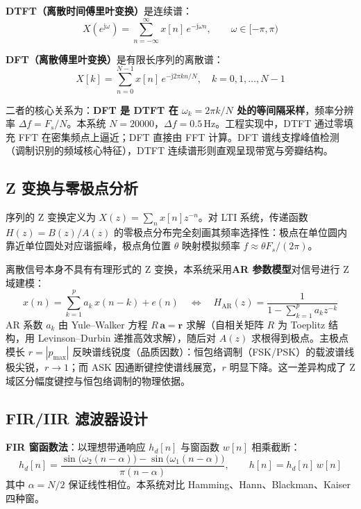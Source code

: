 \documentclass[12pt, a4paper, UTF8]{ctexart}
\begin{document}
\textbf{DTFT（离散时间傅里叶变换）}是连续谱：
\begin{equation}
X(e^{\mathrm{j}\omega}) = \sum_{n=-\infty}^{\infty} x[n]\,e^{-\mathrm{j}\omega n}, \qquad \omega \in [-\pi, \pi)
\end{equation}

\textbf{DFT（离散傅里叶变换）}是有限长序列的离散谱：
\begin{equation}
X[k] = \sum_{n=0}^{N-1} x[n]\,e^{-\mathrm{j}2\pi kn/N}, \quad k=0,1,\dots,N-1
\end{equation}

二者的核心关系为：\textbf{DFT 是 DTFT 在 $\omega_k = 2\pi k/N$ 处的等间隔采样}，频率分辨率 $\Delta f = F_s/N$。本系统 $N=20000$，$\Delta f = 0.5\,\mathrm{Hz}$。工程实现中，DTFT 通过零填充 FFT 在密集频点上逼近；DFT 直接由 FFT 计算。DFT 谱线支撑峰值检测（调制识别的频域核心特征），DTFT 连续谱形则直观呈现带宽与旁瓣结构。

\subsection{Z 变换与零极点分析}

序列的 Z 变换定义为 $X(z)=\sum_n x[n]z^{-n}$。对 LTI 系统，传递函数 $H(z)=B(z)/A(z)$ 的零极点分布完全刻画其频率选择性：极点在单位圆内靠近单位圆处对应谐振峰，极点角位置 $\theta$ 映射模拟频率 $f \approx \theta F_s/(2\pi)$。

离散信号本身不具有有理形式的 Z 变换，本系统采用\textbf{AR 参数模型}对信号进行 Z 域建模：
\begin{equation}
x(n) = \sum_{k=1}^{p} a_k\, x(n-k) + e(n) \quad\Longleftrightarrow\quad H_{\mathrm{AR}}(z) = \frac{1}{1-\sum_{k=1}^{p} a_k z^{-k}}
\end{equation}
AR 系数 $a_k$ 由 Yule--Walker 方程 $R\,\bm{a}=\bm{r}$ 求解（自相关矩阵 $R$ 为 Toeplitz 结构，用 Levinson--Durbin 递推高效求解），随后对 $A(z)$ 求根得到极点。主极点模长 $r=|p_{\max}|$ 反映谱线锐度（品质因数）：恒包络调制（FSK/PSK）的载波谱线极尖锐，$r\to 1$；而 ASK 因通断键控使谱线展宽，$r$ 明显下降。这一差异构成了 Z 域区分幅度键控与恒包络调制的物理依据。

\subsection{FIR/IIR 滤波器设计}

\textbf{FIR 窗函数法}：以理想带通响应 $h_d[n]$ 与窗函数 $w[n]$ 相乘截断：
\begin{equation}
h_d[n] = \frac{\sin\big(\omega_2(n-\alpha)\big)-\sin\big(\omega_1(n-\alpha)\big)}{\pi (n-\alpha)}, \qquad h[n] = h_d[n]\,w[n]
\end{equation}
其中 $\alpha=N/2$ 保证线性相位。本系统对比 Hamming、Hann、Blackman、Kaiser 四种窗。
\end{document}
